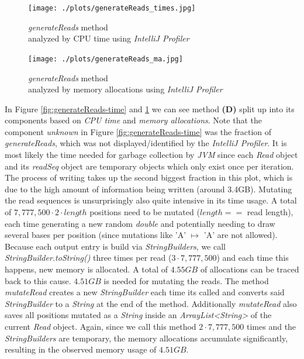 \documentclass[12pt]{article}
\begin{document}
\begin{figure}[t]
    \centering
    \begin{minipage}[t]{0.45\textwidth} 
        \centering
        \texttt{[image: ./plots/generateReads\_times.jpg]} 
        \caption{\textit{generateReads} method\\ analyzed by CPU time using \textit{IntelliJ Profiler}}
        \label{fig:generateReads-time}
    \end{minipage}
    \hfill
    \begin{minipage}[t]{0.45\textwidth}
        \centering
        \texttt{[image: ./plots/generateReads\_ma.jpg]}
        \caption{\textit{generateReads} method\\ analyzed by memory allocations using \textit{IntelliJ Profiler}}
        \label{fig:generateReads-ma}
    \end{minipage}
\end{figure}
In Figure \ref{fig:generateReads-time} and \ref{fig:generateReads-ma} we can see method \textbf{(D)} split up 
into its components based on \textit{CPU time} and \textit{memory allocations}.
Note that the component \textit{unknown} in Figure \ref{fig:generateReads-time} was the fraction of \textit{generateReads}, which was not 
displayed/identified by the \textit{IntelliJ Profiler}. It is most likely the time needed for garbage collection by \textit{JVM} since each \textit{Read} object
and its \textit{readSeq} object are temporary objects which only exist once per iteration.
The process of writing takes up the second biggest fraction in this plot, which is due to the 
high amount of information being written (around 3.4GB). Mutating the read sequences is unsurprisingly also 
quite intensive in its time usage. A total of $7,777,500 \cdot 2 \cdot length$ positions need to be mutated ($length ==$ read length), each time 
generating a new random \textit{double} and potentially needing to draw several bases per position (since mutations like 
'A' $\mapsto$ 'A' are not allowed). 
Because each output entry is build via \textit{StringBuilders}, we call \textit{StringBuilder.toString()} three times per read
($3 \cdot 7,777,500$) and each time this happens, new memory is allocated. A total of $4.55 GB$ of allocations can be traced 
back to this cause.
$4.51GB$ is needed for mutating the reads. The method \textit{mutateRead} creates a new \textit{StringBuilder} each time its called and converts said \textit{StringBuilder} to a \textit{String}
at the end of the method. Additionally \textit{mutateRead} also saves all positions mutated as a \textit{String} inside an \textit{ArrayList<String>} of the 
current \textit{Read} object. Again, since we call this method $2 \cdot 7,777,500$ times and the \textit{StringBuilders} are temporary, 
the memory allocations accumulate significantly, resulting in the observed memory usage of $4.51GB$.
\end{document}
